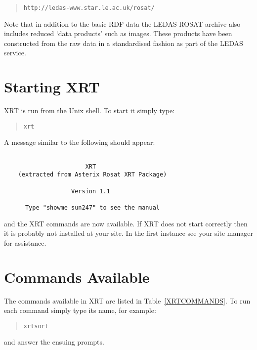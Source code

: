 \documentclass[twoside,11pt]{article}
\newcommand{\htmladdnormallink}[2]{#1}
\newcommand{\xlabel}[1]{}
\renewcommand{\_}{\texttt{\symbol{95}}}
\begin{document}
\begin{quote}
\htmladdnormallink{{\tt http://ledas-www.star.le.ac.uk/rosat/}}
{http://ledas-www.star.le.ac.uk/rosat/}
\end{quote}

Note that in addition to the basic RDF data the LEDAS ROSAT archive also
includes reduced `data products' such as images.  These products have been
constructed from the raw data in a standardised fashion as part of the
LEDAS service.


\section{\xlabel{START}\label{START}Starting XRT}

XRT is run from the Unix shell.  To start it simply type:

\begin{quote}
{\tt xrt}
\end{quote}

A message similar to the following should appear:

\begin{verbatim}

                       XRT
    (extracted from Asterix Rosat XRT Package)

                   Version 1.1

      Type "showme sun247" to see the manual
\end{verbatim}

and the XRT commands are now available.  If XRT does not start correctly
then it is probably not installed at your site.  In the first instance
see your site manager for assistance.


\section{\xlabel{COMMANDS}\label{COMMANDS}Commands Available}

The commands available in XRT are listed in Table~\ref{XRTCOMMANDS}.
To run each command simply type its name, for example:

\begin{quote}
{\tt xrtsort}
\end{quote}

and answer the ensuing prompts.
\end{document}
